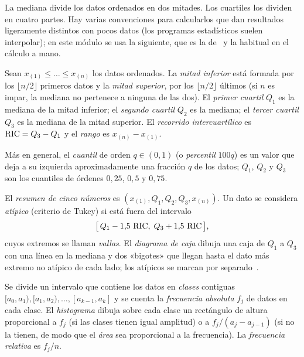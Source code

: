La mediana divide los datos ordenados en dos mitades. Los cuartiles los dividen en cuatro partes. Hay varias convenciones para calcularlos que dan resultados ligeramente distintos con pocos datos (los programas estadísticos suelen interpolar); en este módulo se usa la siguiente, que es la de~\cite[§2.3]{openstax} y la habitual en el cálculo a mano.

\begin{definicion}\label{def:t1-cuartiles}
Sean $x_{(1)}\le\dots\le x_{(n)}$ los datos ordenados. La \emph{mitad inferior} está formada por los $\lfloor n/2\rfloor$ primeros datos y la \emph{mitad superior}, por los $\lfloor n/2\rfloor$ últimos (si $n$ es impar, la mediana no pertenece a ninguna de las dos). El \emph{primer cuartil} $Q_1$ es la mediana de la mitad inferior; el \emph{segundo cuartil} $Q_2$ es la mediana; el \emph{tercer cuartil} $Q_3$ es la mediana de la mitad superior. El \emph{recorrido intercuartílico} es $\operatorname{RIC}=Q_3-Q_1$ y el \emph{rango} es $x_{(n)}-x_{(1)}$.
\end{definicion}

Más en general, el \emph{cuantil} de orden $q\in(0,1)$ (o \emph{percentil} $100q$) es un valor que deja a su izquierda aproximadamente una fracción $q$ de los datos; $Q_1$, $Q_2$ y $Q_3$ son los cuantiles de órdenes $0{,}25$, $0{,}5$ y $0{,}75$.

\begin{definicion}\label{def:t1-caja}
El \emph{resumen de cinco números} es $(x_{(1)},Q_1,Q_2,Q_3,x_{(n)})$. Un dato se considera \emph{atípico} (criterio de Tukey) si está fuera del intervalo
\[
\bigl[\,Q_1-1{,}5\,\operatorname{RIC},\;Q_3+1{,}5\,\operatorname{RIC}\,\bigr],
\]
cuyos extremos se llaman \emph{vallas}. El \emph{diagrama de caja} dibuja una caja de $Q_1$ a $Q_3$ con una línea en la mediana y dos «bigotes» que llegan hasta el dato más extremo no atípico de cada lado; los atípicos se marcan por separado~\cite[§2.4]{openstax}.
\end{definicion}

\addtocounter{definicion}{1}%

\addtocounter{figure}{1}%

\begin{definicion}[Histograma]\label{def:t1-histograma}
Se divide un intervalo que contiene los datos en \emph{clases} contiguas $[a_0,a_1),[a_1,a_2),\dots,[a_{k-1},a_k]$ y se cuenta la \emph{frecuencia absoluta} $f_j$ de datos en cada clase. El \emph{histograma} dibuja sobre cada clase un rectángulo de altura proporcional a $f_j$ (si las clases tienen igual amplitud) o a $f_j/(a_j-a_{j-1})$ (si no la tienen, de modo que el \emph{área} sea proporcional a la frecuencia). La \emph{frecuencia relativa} es $f_j/n$.
\end{definicion}

